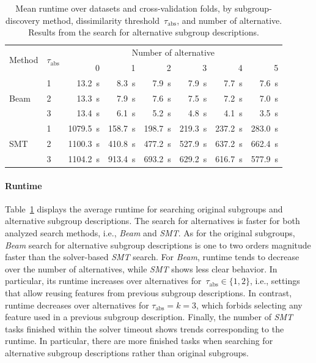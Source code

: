 \documentclass{article}
\theoremstyle{definition}
\begin{document}
\begin{table}[t]
	\centering
	\begin{tabular}{llrrrrrr}
		\toprule
		\multirow{2}{*}{Method} & \multirow{2}{*}{$\tau_{\text{abs}}$} & \multicolumn{6}{c}{Number of alternative} \\
		\cmidrule(lr){3-8}
		& &  0 & 1 & 2 & 3 & 4 & 5 \\
		\midrule
		\multirow[t]{3}{*}{Beam} & 1 & 13.2~s & 8.3~s & 7.9~s & 7.9~s & 7.7~s & 7.6~s \\
		& 2 & 13.3~s & 7.9~s & 7.6~s & 7.5~s & 7.2~s & 7.0~s \\
		& 3 & 13.4~s & 6.1~s & 5.2~s & 4.8~s & 4.1~s & 3.5~s \\
		\multirow[t]{3}{*}{SMT} & 1 & 1079.5~s & 158.7~s & 198.7~s & 219.3~s & 237.2~s & 283.0~s \\
		& 2 & 1100.3~s & 410.8~s & 477.2~s & 527.9~s & 637.2~s & 662.4~s \\
		& 3 & 1104.2~s & 913.4~s & 693.2~s & 629.2~s & 616.7~s & 577.9~s \\
		\bottomrule
	\end{tabular}
	\caption{
		Mean runtime over datasets and cross-validation folds, by subgroup-discovery method, dissimilarity threshold~$\tau_{\text{abs}}$, and number of alternative.
		Results from the search for alternative subgroup descriptions.
	}
	\label{tab:csd:alteratives-runtime}
\end{table}

\paragraph{Runtime}

Table~\ref{tab:csd:alteratives-runtime} displays the average runtime for searching original subgroups and alternative subgroup descriptions.
The search for alternatives is faster for both analyzed search methods, i.e., \emph{Beam} and \emph{SMT}.
As for the original subgroups, \emph{Beam} search for alternative subgroup descriptions is one to two orders magnitude faster than the solver-based \emph{SMT} search.
For \emph{Beam}, runtime tends to decrease over the number of alternatives, while \emph{SMT} shows less clear behavior.
In particular, its runtime increases over alternatives for~$\tau_{\text{abs}} \in \{1, 2\}$, i.e., settings that allow reusing features from previous subgroup descriptions.
In contrast, runtime decreases over alternatives for $\tau_{\text{abs}} = k = 3$, which forbids selecting any feature used in a previous subgroup description.
Finally, the number of \emph{SMT} tasks finished within the solver timeout shows trends corresponding to the runtime.
In particular, there are more finished tasks when searching for alternative subgroup descriptions rather than original subgroups.
\end{document}
